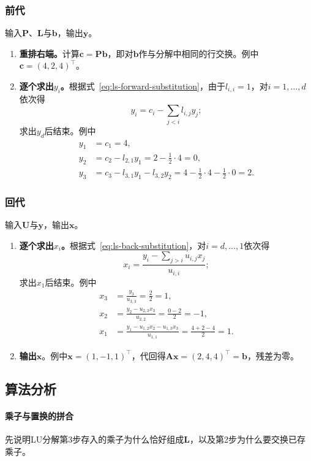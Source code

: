 \subsubsection{前代}
输入$\bm P$、$\bm L$与$\bm b$，输出$\bm y$。
\begin{enumerate}
 \item \textbf{重排右端。}计算$\bm c=\bm P\bm b$，即对$\bm b$作与分解中相同的行交换。例中$\bm c=(4,2,4)^\top$。

 \item \textbf{逐个求出$y_i$。}根据式~\eqref{eq:ls-forward-substitution}，由于$l_{i,i}=1$，对$i=1,\ldots,d$依次得
 \[
  y_i=c_i-\sum_{j<i}l_{i,j}y_j ;
 \]
 求出$y_d$后结束。例中
 \[
  \begin{aligned}
  y_1&=c_1=4,\\
  y_2&=c_2-l_{2,1}y_1=2-\tfrac12\cdot4=0,\\
  y_3&=c_3-l_{3,1}y_1-l_{3,2}y_2=4-\tfrac12\cdot4-\tfrac12\cdot0=2 .
  \end{aligned}
 \]
\end{enumerate}

\subsubsection{回代}
输入$\bm U$与$\bm y$，输出$\bm x$。
\begin{enumerate}
 \item \textbf{逐个求出$x_i$。}根据式~\eqref{eq:ls-back-substitution}，对$i=d,\ldots,1$依次得
 \[
  x_i=\frac{y_i-\sum_{j>i}u_{i,j}x_j}{u_{i,i}} ;
 \]
 求出$x_1$后结束。例中
 \[
  \begin{aligned}
  x_3&=\frac{y_3}{u_{3,3}}=\frac22=1,\\
  x_2&=\frac{y_2-u_{2,3}x_3}{u_{2,2}}=\frac{0-2}{2}=-1,\\
  x_1&=\frac{y_1-u_{1,2}x_2-u_{1,3}x_3}{u_{1,1}}=\frac{4+2-4}{2}=1 .
  \end{aligned}
 \]

 \item \textbf{输出$\bm x$}。例中$\bm x=(1,-1,1)^\top$，代回得$\bm A\bm x=(2,4,4)^\top=\bm b$，残差为零。
\end{enumerate}

\subsection{算法分析}
\paragraph{乘子与置换的拼合}
先说明LU分解第3步存入的乘子为什么恰好组成$\bm L$，以及第2步为什么要交换已存乘子。

